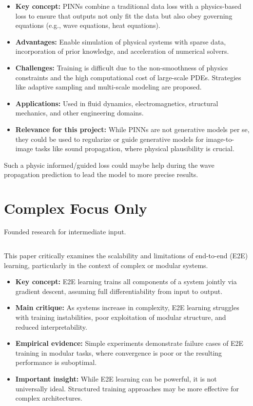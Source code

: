 			\begin{itemize}
				\item \textbf{Key concept:} PINNs combine a traditional data loss with a physics-based loss to ensure that outputs not only fit the data but also obey governing equations (e.g., wave equations, heat equations).
				\item \textbf{Advantages:} Enable simulation of physical systems with sparse data, incorporation of prior knowledge, and acceleration of numerical solvers.
				\item \textbf{Challenges:} Training is difficult due to the non-smoothness of physics constraints and the high computational cost of large-scale PDEs. Strategies like adaptive sampling and multi-scale modeling are proposed.
				\item \textbf{Applications:} Used in fluid dynamics, electromagnetics, structural mechanics, and other engineering domains.
				\item \textbf{Relevance for this project:} While PINNs are not generative models per se, they could be used to regularize or guide generative models for image-to-image tasks like sound propagation, where physical plausibility is crucial.
			\end{itemize}
			
			Such a physic informed/guided loss could maybe help during the wave propagation prediction to lead the model to more precise results.
			
	
	
	\newpage
	\section{Complex Focus Only}
	\label{sec:lit-complex-focus-only}
		Founded research for intermediate input.
	
		\subsection{}
			This paper critically examines the scalability and limitations of end-to-end (E2E) learning, particularly in the context of complex or modular systems.
			
			\begin{itemize}
				\item \textbf{Key concept:} E2E learning trains all components of a system jointly via gradient descent, assuming full differentiability from input to output.
				\item \textbf{Main critique:} As systems increase in complexity, E2E learning struggles with training instabilities, poor exploitation of modular structure, and reduced interpretability.
				\item \textbf{Empirical evidence:} Simple experiments demonstrate failure cases of E2E training in modular tasks, where convergence is poor or the resulting performance is suboptimal.
				\item \textbf{Important insight:} While E2E learning can be powerful, it is not universally ideal. Structured training approaches may be more effective for complex architectures.
			\end{itemize}
			
